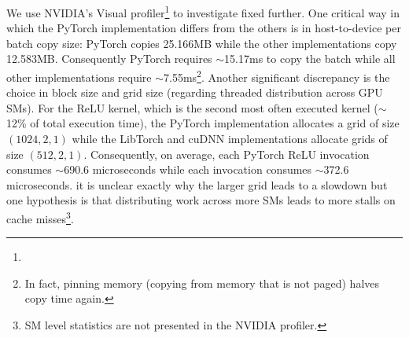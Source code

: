 We use NVIDIA's Visual profiler\footnote{} to investigate fixed  further.
One critical way in which the PyTorch implementation differs from the others is in host-to-device per batch copy size: PyTorch copies 25.166MB while the other implementations copy 12.583MB\@.
Consequently PyTorch requires $\sim$15.17ms to copy the batch while all other implementations require $\sim$7.55ms\footnote{In fact, pinning memory (copying from memory that is not paged) halves copy time again.}.
Another significant discrepancy is the choice in block size and grid size (regarding threaded distribution across GPU SMs).
For the ReLU kernel, which is the second most often executed kernel ($\sim$12\% of total execution time), the PyTorch implementation allocates a grid of size $\left( 1024,2,1 \right)$ while the LibTorch and cuDNN implementations allocate grids of size $\left( 512,2,1 \right)$.
Consequently, on average, each PyTorch ReLU invocation consumes $\sim$690.6 microseconds while each invocation consumes $\sim$372.6 microseconds.
it is unclear exactly why the larger grid leads to a slowdown but one hypothesis is that distributing work across more SMs leads to more stalls on cache misses\footnote{SM level statistics are not presented in the NVIDIA profiler.}.



